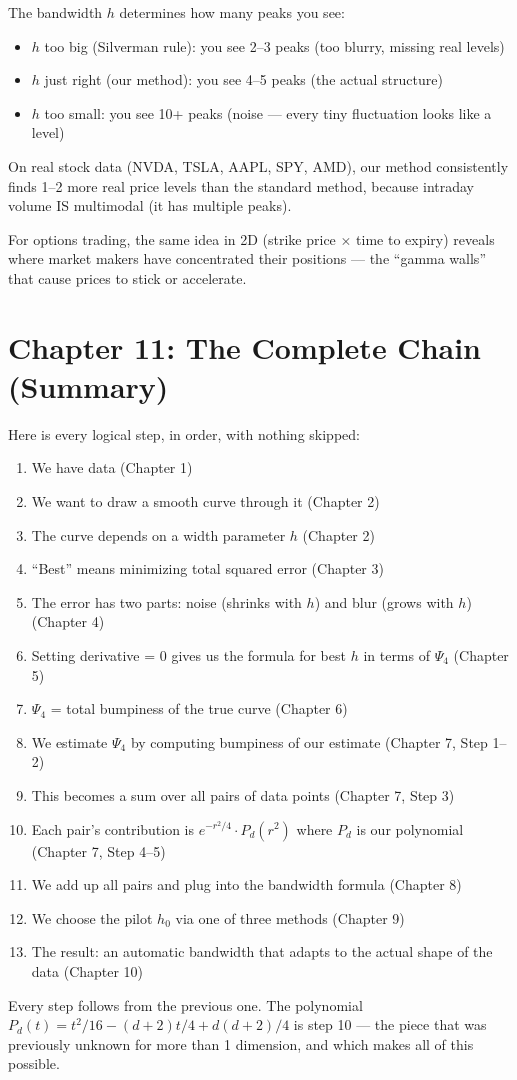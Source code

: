 \documentclass[12pt]{article}
\begin{document}
The bandwidth $h$ determines how many peaks you see:
\begin{itemize}
\item $h$ too big (Silverman rule): you see 2--3 peaks (too blurry, missing real levels)
\item $h$ just right (our method): you see 4--5 peaks (the actual structure)
\item $h$ too small: you see 10+ peaks (noise --- every tiny fluctuation looks like a level)
\end{itemize}

On real stock data (NVDA, TSLA, AAPL, SPY, AMD), our method consistently finds 1--2 more real price levels than the standard method, because intraday volume IS multimodal (it has multiple peaks).

For options trading, the same idea in 2D (strike price $\times$ time to expiry) reveals where market makers have concentrated their positions --- the ``gamma walls'' that cause prices to stick or accelerate.

\section{Chapter 11: The Complete Chain (Summary)}

Here is every logical step, in order, with nothing skipped:

\begin{enumerate}
\item We have data (Chapter 1)
\item We want to draw a smooth curve through it (Chapter 2)
\item The curve depends on a width parameter $h$ (Chapter 2)
\item ``Best'' means minimizing total squared error (Chapter 3)
\item The error has two parts: noise (shrinks with $h$) and blur (grows with $h$) (Chapter 4)
\item Setting derivative = 0 gives us the formula for best $h$ in terms of $\Psi_4$ (Chapter 5)
\item $\Psi_4$ = total bumpiness of the true curve (Chapter 6)
\item We estimate $\Psi_4$ by computing bumpiness of our estimate (Chapter 7, Step 1--2)
\item This becomes a sum over all pairs of data points (Chapter 7, Step 3)
\item Each pair's contribution is $e^{-r^2/4} \cdot P_d(r^2)$ where $P_d$ is our polynomial (Chapter 7, Step 4--5)
\item We add up all pairs and plug into the bandwidth formula (Chapter 8)
\item We choose the pilot $h_0$ via one of three methods (Chapter 9)
\item The result: an automatic bandwidth that adapts to the actual shape of the data (Chapter 10)
\end{enumerate}

Every step follows from the previous one. The polynomial $P_d(t) = t^2/16 - (d+2)t/4 + d(d+2)/4$ is step 10 --- the piece that was previously unknown for more than 1 dimension, and which makes all of this possible.
\end{document}
